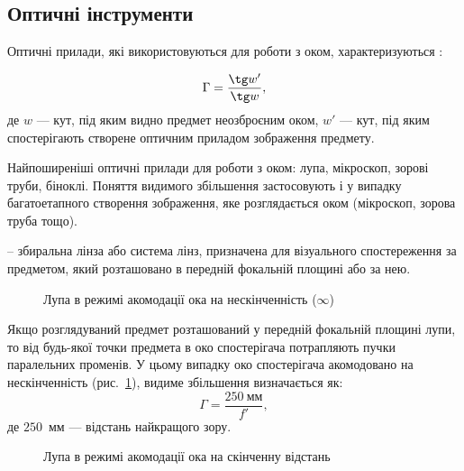 \subsection{Оптичні інструменти}

Оптичні прилади, які використовуються для роботи з оком, характеризуються :

\begin{equation}\label{eq:apparent increase}
	\Gamma = \frac{\tg w'}{\tg w},
\end{equation}
де $w$ ---  кут, під яким видно предмет неозброєним оком, $w'$ ---
кут, під яким спостерігають створене оптичним приладом зображення предмету.


Найпоширеніші оптичні прилади для роботи з оком: лупа, мікроскоп, зорові труби, біноклі. Поняття видимого збільшення застосовують і у випадку багатоетапного створення
зображення, яке розглядається оком (мікроскоп, зорова труба тощо).

 -- збиральна лінза або система лінз, призначена для візуального
спостереження за предметом, який розташовано в передній фокальній
площині або за нею.

\begin{figure}[h!]\centering
    
    \caption{Лупа в режимі акомодації ока на нескінченність ($\infty$)}
    \label{pic:Lupa}
\end{figure}

Якщо розглядуваний предмет розташований у передній фокальній площині лупи, то від будь-якої точки предмета в око спостерігача потрапляють пучки паралельних променів. У цьому випадку око спостерігача акомодовано на нескінченність (рис.~\ref{pic:Lupa}), видиме збільшення визначається як:
\begin{equation}\label{}
	\Gamma = \frac{250\ \text{мм}}{f'},
\end{equation}
де $250$~мм --- відстань найкращого зору.

\begin{figure}[h!]\centering
    
    \caption{Лупа в режимі акомодації ока на скінченну відстань}
    \label{pic:rays_in_Lupa}
\end{figure}

